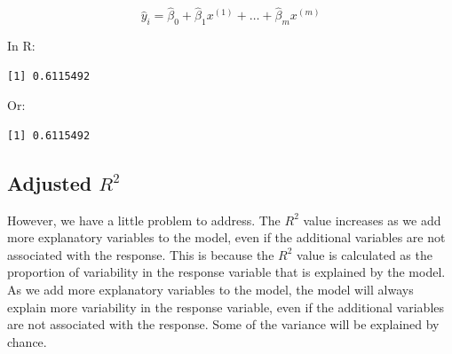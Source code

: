 \documentclass[
  letterpaper,
  8pt,
  a4paper]{book}
\newenvironment{Shaded}{\begin{snugshade}}{\end{snugshade}}
\newcommand{\AttributeTok}[1]{\textcolor[rgb]{0.40,0.45,0.13}{#1}}
\newcommand{\DecValTok}[1]{\textcolor[rgb]{0.68,0.00,0.00}{#1}}
\newcommand{\FunctionTok}[1]{\textcolor[rgb]{0.28,0.35,0.67}{#1}}
\newcommand{\NormalTok}[1]{\textcolor[rgb]{0.00,0.23,0.31}{#1}}
\newcommand{\OtherTok}[1]{\textcolor[rgb]{0.00,0.23,0.31}{#1}}
\newcommand{\SpecialCharTok}[1]{\textcolor[rgb]{0.37,0.37,0.37}{#1}}
\newcommand{\StringTok}[1]{\textcolor[rgb]{0.13,0.47,0.30}{#1}}
\begin{document}
\[\hat{y}_i = \hat\beta_0 + \hat\beta_1 x^{(1)} + \ldots + \hat\beta_m x^{(m)}\]

In R:

\begin{Shaded}
\end{Shaded}

\begin{verbatim}
[1] 0.6115492
\end{verbatim}

Or:

\begin{Shaded}
\end{Shaded}

\begin{verbatim}
[1] 0.6115492
\end{verbatim}

\subsection*{\texorpdfstring{Adjusted
\(R^2\)}{Adjusted R\^{}2}}\label{adjusted-r2}

However, we have a little problem to address. The \(R^2\) value
increases as we add more explanatory variables to the model, even if the
additional variables are not associated with the response. This is
because the \(R^2\) value is calculated as the proportion of variability
in the response variable that is explained by the model. As we add more
explanatory variables to the model, the model will always explain more
variability in the response variable, even if the additional variables
are not associated with the response. Some of the variance will be
explained by chance.
\end{document}
